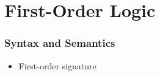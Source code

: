 \documentclass{scrartcl}
\begin{document}
\section{First-Order Logic}
\subsubsection{Syntax and Semantics}
\begin{itemize}
    \item
        First-order signature
        \begin{itemize}
                
        \end{itemize}
\end{itemize}
\end{document}

